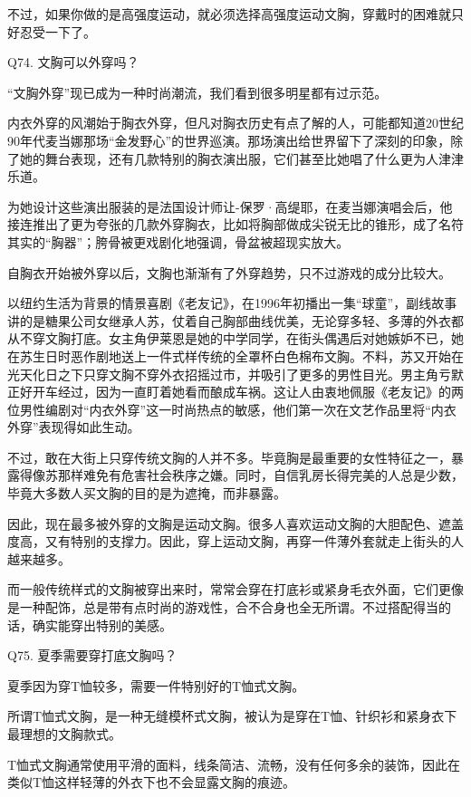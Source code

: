 \documentclass[12pt,UTF8]{ctexbook}
\begin{document}
不过，如果你做的是高强度运动，就必须选择高强度运动文胸，穿戴时的困难就只好忍受一下了。





Q74. 文胸可以外穿吗？


“文胸外穿”现已成为一种时尚潮流，我们看到很多明星都有过示范。

内衣外穿的风潮始于胸衣外穿，但凡对胸衣历史有点了解的人，可能都知道20世纪90年代麦当娜那场“金发野心”的世界巡演。那场演出给世界留下了深刻的印象，除了她的舞台表现，还有几款特别的胸衣演出服，它们甚至比她唱了什么更为人津津乐道。

为她设计这些演出服装的是法国设计师让-保罗·高缇耶，在麦当娜演唱会后，他接连推出了更为夸张的几款外穿胸衣，比如将胸部做成尖锐无比的锥形，成了名符其实的“胸器”；胯骨被更戏剧化地强调，骨盆被超现实放大。

自胸衣开始被外穿以后，文胸也渐渐有了外穿趋势，只不过游戏的成分比较大。

以纽约生活为背景的情景喜剧《老友记》，在1996年初播出一集“球童”，副线故事讲的是糖果公司女继承人苏，仗着自己胸部曲线优美，无论穿多轻、多薄的外衣都从不穿文胸打底。女主角伊莱恩是她的中学同学，在街头偶遇后对她嫉妒不已，她在苏生日时恶作剧地送上一件式样传统的全罩杯白色棉布文胸。不料，苏又开始在光天化日之下只穿文胸不穿外衣招摇过市，并吸引了更多的男性目光。男主角亏默正好开车经过，因为一直盯着她看而酿成车祸。这让人由衷地佩服《老友记》的两位男性编剧对“内衣外穿”这一时尚热点的敏感，他们第一次在文艺作品里将“内衣外穿”表现得如此生动。


不过，敢在大街上只穿传统文胸的人并不多。毕竟胸是最重要的女性特征之一，暴露得像苏那样难免有危害社会秩序之嫌。同时，自信乳房长得完美的人总是少数，毕竟大多数人买文胸的目的是为遮掩，而非暴露。

因此，现在最多被外穿的文胸是运动文胸。很多人喜欢运动文胸的大胆配色、遮盖度高，又有特别的支撑力。因此，穿上运动文胸，再穿一件薄外套就走上街头的人越来越多。

而一般传统样式的文胸被穿出来时，常常会穿在打底衫或紧身毛衣外面，它们更像是一种配饰，总是带有点时尚的游戏性，合不合身也全无所谓。不过搭配得当的话，确实能穿出特别的美感。





Q75. 夏季需要穿打底文胸吗？


夏季因为穿T恤较多，需要一件特别好的T恤式文胸。

所谓T恤式文胸，是一种无缝模杯式文胸，被认为是穿在T恤、针织衫和紧身衣下最理想的文胸款式。

T恤式文胸通常使用平滑的面料，线条简洁、流畅，没有任何多余的装饰，因此在类似T恤这样轻薄的外衣下也不会显露文胸的痕迹。
\end{document}
